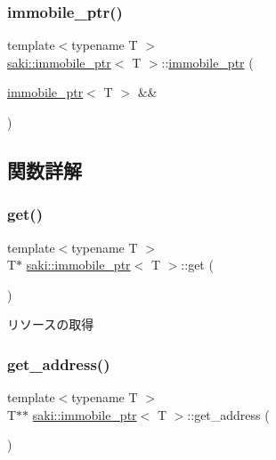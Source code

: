 \subsubsection{\texorpdfstring{immobile\+\_\+ptr()}{immobile\_ptr()}\hspace{0.1cm}{\footnotesize\ttfamily [3/3]}}
{\footnotesize\ttfamily template$<$typename T $>$ \\
\mbox{\hyperlink{classsaki_1_1immobile__ptr}{saki\+::immobile\+\_\+ptr}}$<$ T $>$\+::\mbox{\hyperlink{classsaki_1_1immobile__ptr}{immobile\+\_\+ptr}} (\begin{DoxyParamCaption}\item[{\mbox{\hyperlink{classsaki_1_1immobile__ptr}{immobile\+\_\+ptr}}$<$ T $>$ \&\&}]{ }\end{DoxyParamCaption})\hspace{0.3cm}{\ttfamily [delete]}}



\subsection{関数詳解}
\mbox{\label{classsaki_1_1immobile__ptr_a41956c8a6ba8fd9fb3cb092d94da5ea8}} 
\subsubsection{\texorpdfstring{get()}{get()}}
{\footnotesize\ttfamily template$<$typename T $>$ \\
T$\ast$ \mbox{\hyperlink{classsaki_1_1immobile__ptr}{saki\+::immobile\+\_\+ptr}}$<$ T $>$\+::get (\begin{DoxyParamCaption}{ }\end{DoxyParamCaption})\hspace{0.3cm}{\ttfamily [inline]}}



リソースの取得 

\mbox{\label{classsaki_1_1immobile__ptr_a2d4f142600717223e0855d8a977e7429}} 
\subsubsection{\texorpdfstring{get\+\_\+address()}{get\_address()}}
{\footnotesize\ttfamily template$<$typename T $>$ \\
T$\ast$$\ast$ \mbox{\hyperlink{classsaki_1_1immobile__ptr}{saki\+::immobile\+\_\+ptr}}$<$ T $>$\+::get\+\_\+address (\begin{DoxyParamCaption}{ }\end{DoxyParamCaption})\hspace{0.3cm}{\ttfamily [inline]}}



